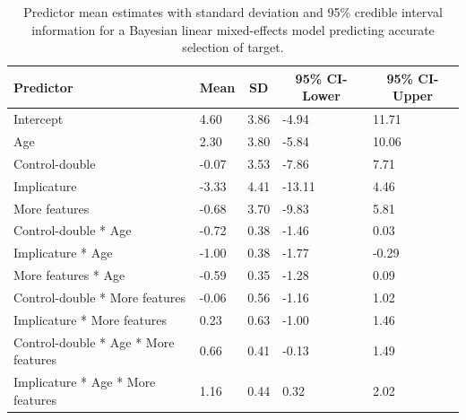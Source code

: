 \documentclass[man]{apa6}
\begin{document}
\begin{table}[tbp]
\begin{center}
\begin{threeparttable}
\caption{\label{tab:brmacc}Predictor mean estimates with standard deviation and 95\% credible interval information for a Bayesian linear mixed-effects model predicting accurate selection of target.}
\begin{tabular}{lllll}
\toprule
Predictor & \multicolumn{1}{c}{Mean} & \multicolumn{1}{c}{SD} & \multicolumn{1}{c}{95\% CI-Lower} & \multicolumn{1}{c}{95\% CI-Upper}\\
\midrule
Intercept & 4.60 & 3.86 & -4.94 & 11.71\\
Age & 2.30 & 3.80 & -5.84 & 10.06\\
Control-double & -0.07 & 3.53 & -7.86 & 7.71\\
Implicature & -3.33 & 4.41 & -13.11 & 4.46\\
More features & -0.68 & 3.70 & -9.83 & 5.81\\
Control-double * Age & -0.72 & 0.38 & -1.46 & 0.03\\
Implicature * Age & -1.00 & 0.38 & -1.77 & -0.29\\
More features * Age & -0.59 & 0.35 & -1.28 & 0.09\\
Control-double * More features & -0.06 & 0.56 & -1.16 & 1.02\\
Implicature * More features & 0.23 & 0.63 & -1.00 & 1.46\\
Control-double * Age * More features & 0.66 & 0.41 & -0.13 & 1.49\\
Implicature * Age * More features & 1.16 & 0.44 & 0.32 & 2.02\\
\bottomrule
\end{tabular}
\end{threeparttable}
\end{center}
\end{table}
\end{document}

